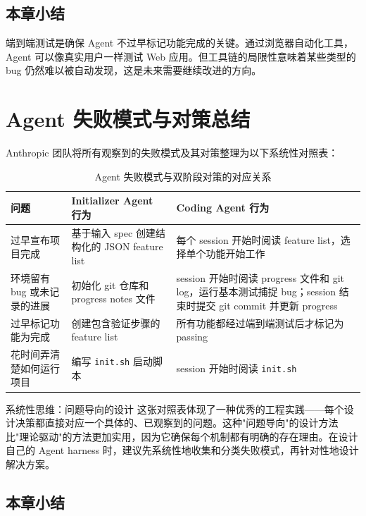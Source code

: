 \documentclass[a4paper]{article}
\begin{document}
\subsection{本章小结}

端到端测试是确保 Agent 不过早标记功能完成的关键。通过浏览器自动化工具，Agent 可以像真实用户一样测试 Web 应用。但工具链的局限性意味着某些类型的 bug 仍然难以被自动发现，这是未来需要继续改进的方向。


\section{Agent 失败模式与对策总结}

Anthropic 团队将所有观察到的失败模式及其对策整理为以下系统性对照表：

\begin{table}[H]
\centering
\small
\begin{tabular}{p{3cm}p{4.5cm}p{5.5cm}}
\toprule
\textbf{问题} & \textbf{Initializer Agent 行为} & \textbf{Coding Agent 行为} \\
\midrule
过早宣布项目完成 & 基于输入 spec 创建结构化的 JSON feature list & 每个 session 开始时阅读 feature list，选择单个功能开始工作 \\
\midrule
环境留有 bug 或未记录的进展 & 初始化 git 仓库和 progress notes 文件 & session 开始时阅读 progress 文件和 git log，运行基本测试捕捉 bug；session 结束时提交 git commit 并更新 progress \\
\midrule
过早标记功能为完成 & 创建包含验证步骤的 feature list & 所有功能都经过端到端测试后才标记为 passing \\
\midrule
花时间弄清楚如何运行项目 & 编写 \texttt{init.sh} 启动脚本 & session 开始时阅读 \texttt{init.sh} \\
\bottomrule
\end{tabular}
\caption{Agent 失败模式与双阶段对策的对应关系}
\end{table}

\begin{importantbox}{系统性思维：问题导向的设计}
这张对照表体现了一种优秀的工程实践——每个设计决策都直接对应一个具体的、已观察到的问题。这种"问题导向"的设计方法比"理论驱动"的方法更加实用，因为它确保每个机制都有明确的存在理由。在设计自己的 Agent harness 时，建议先系统性地收集和分类失败模式，再针对性地设计解决方案。
\end{importantbox}

\subsection{本章小结}
\end{document}
